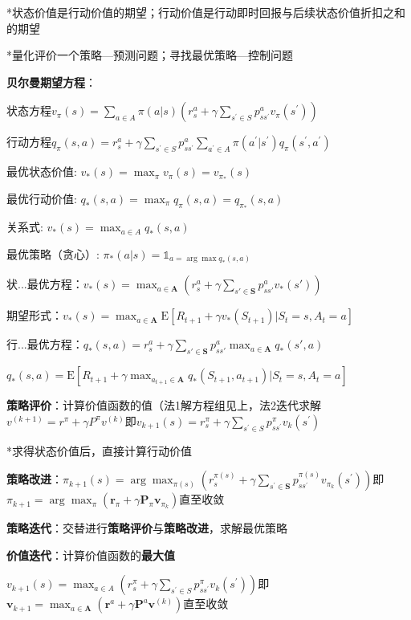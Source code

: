 	*状态价值是行动价值的期望；行动价值是行动即时回报与后续状态价值折扣之和的期望
	
	*量化评价一个策略—预测问题；寻找最优策略—控制问题
	
	\textbf{贝尔曼期望方程}：
	
	状态方程$v_{\pi}(s)=\sum_{a\in A}\pi(a|s)\left(r_{s}^{a}+\gamma\sum_{s^{\prime}\in S}p_{ss^{\prime}}^{a}v_{\pi}(s^{\prime})\right)$
	
	行动方程$q_{\pi}(s, a)=r_{s}^{a}+\gamma\sum_{s^{\prime}\in S}p_{ss^{\prime}}^{a}\sum_{a^{\prime}\in A}\pi(a^{\prime}|s^{\prime})q_{\pi}(s^{\prime},a^{\prime})$
	
	最优状态价值: $v_{*}(s)=\max_{\pi} v_{\pi}(s)=v_{\pi_{*}}(s)$
	
	最优行动价值: $q_{*}(s,a)=\max_{\pi} q_{\pi}(s,a)=q_{\pi_{*}}(s,a)$
	
	关系式: $v_{*}(s)=\max_{a\in A}q_{*}(s,a)$
	
	最优策略（贪心）: $\pi_{*}(a|s)=\mathbb{1}_{a=\arg\max q_{*}(s,a)}$
	
	状...最优方程：$v_*(s)=\max_{a\in\mathbf{A}}\left(r_s^a+\gamma\sum_{s'\in\mathbf{S}}p_{ss'}^av_*(s')\right)$
	
	期望形式：$v_*(s)=\max_{a\in\mathbf{A}}\mathrm{E}[R_{t + 1}+\gamma v_*(S_{t + 1})|S_t = s,A_t = a]$
	
	行...最优方程：$q_*(s,a)=r_s^a+\gamma\sum_{s'\in\mathbf{S}}p_{ss'}^a\max_{a\in\mathbf{A}}q_*(s',a)$
	
	$q_*(s,a)=\mathrm{E}[R_{t + 1}+\gamma\max_{a_{t + 1}\in\mathbf{A}}q_*(S_{t + 1},a_{t + 1})|S_t = s,A_t = a]$
	
	\textbf{策略评价}：计算价值函数的值（法1解方程组见上，法2迭代求解$v^{(k+1)}=r^{\pi}+\gamma P^{\pi} v^{(k)}$即$v_{k+1}(s)=r_{s}^{\pi}+\gamma\sum_{s^{\prime}\in S}p_{ss^{\prime}}^{\pi} v_{k}(s^{\prime})$
	
	*求得状态价值后，直接计算行动价值
	
	\textbf{策略改进}：$\pi_{k+1}(s)=\arg\max_{\pi(s)}\left(r_{s}^{\pi(s)}+\gamma\sum_{s^{\prime}\in\mathbf{S}}p_{ss^{\prime}}^{\pi(s)}v_{\pi_{k}}\left(s^{\prime}\right)\right)$即$\pi_{k+1}=\arg\max_{\pi}\left(\mathbf{r}_{\pi}+\gamma\mathbf{P}_{\pi}\mathbf{v}_{\pi_{k}}\right)$直至收敛
	
	\textbf{策略迭代}：交替进行\textbf{策略评价}与\textbf{策略改进}，求解最优策略
	
	\textbf{价值迭代}：计算价值函数的\textbf{最大值}
	
	$v_{k+1}(s)=\max_{a\in A}\left(r_{s}^{\pi}+\gamma\sum_{s^{\prime}\in S}p_{ss^{\prime}}^{\pi}v_{k}(s^{\prime})\right)$即$\mathbf{v}_{k+1}=\max_{a \in \mathbf{A}}\left(\mathbf{r}^a+\gamma\mathbf{P}^a\mathbf{v}^{(k)}\right)$直至收敛
	
